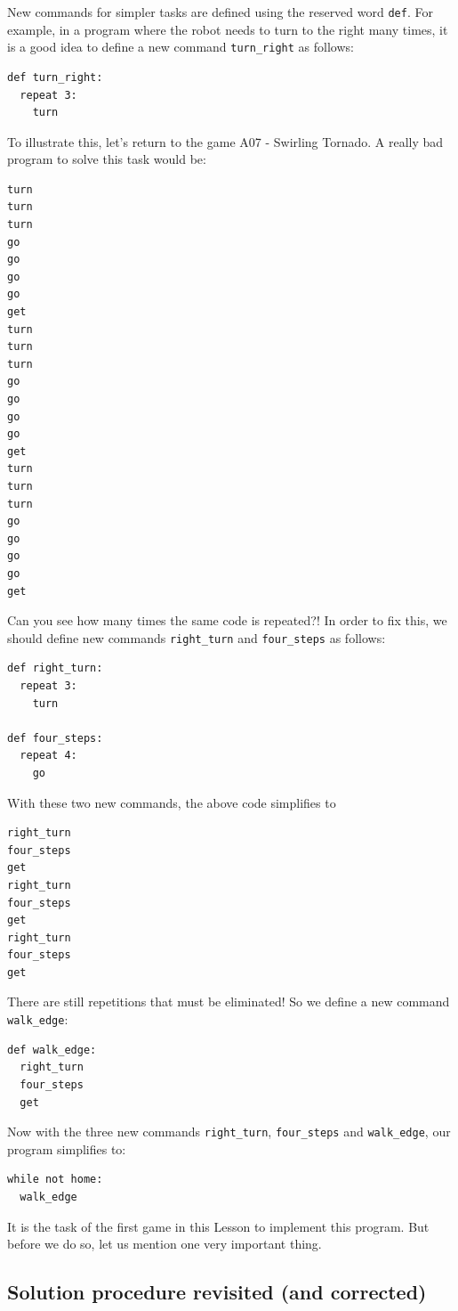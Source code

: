 \documentclass[article,A4,12pt]{llncs}
\begin{document}
\noindent
New commands for simpler tasks are defined using the reserved word 
{\tt def}. For example, in a program where the robot needs to turn to the 
right many times, it is a good idea to define a new command {\tt turn\_right}
as follows:

\begin{verbatim}
def turn_right:
  repeat 3:
    turn
\end{verbatim}
To illustrate this, let's return to the game A07 - Swirling Tornado.
A really bad program to solve this task would be:

{\small
\begin{verbatim}
turn
turn
turn
go
go
go
go 
get
turn
turn
turn
go
go
go
go 
get
turn
turn
turn
go
go
go
go
get
\end{verbatim}
}
\noindent
Can you see how many times the same code is repeated?! In order to fix this, 
we should define new commands {\tt right\_turn} and {\tt four\_steps} as
follows:

{\small
\begin{verbatim}
def right_turn:
  repeat 3:
    turn

def four_steps:
  repeat 4:
    go
\end{verbatim}
}
\noindent
With these two new commands, the above code simplifies to 

{\small
\begin{verbatim}
right_turn
four_steps
get
right_turn
four_steps
get
right_turn
four_steps
get
\end{verbatim}
}
\noindent
There are still repetitions that must be eliminated! So we define a new command 
{\tt walk\_edge}:

{\small
\begin{verbatim}
def walk_edge:
  right_turn
  four_steps
  get
\end{verbatim}
}
\noindent
Now with the three new commands {\tt right\_turn}, {\tt four\_steps} and
{\tt walk\_edge}, our program simplifies to:

{\small
\begin{verbatim}
while not home:
  walk_edge
\end{verbatim}
}
\noindent
It is the task of the first game in this Lesson to implement this program. But before we 
do so, let us mention one very important thing.

\subsection{Solution procedure revisited (and corrected)}
\end{document}
